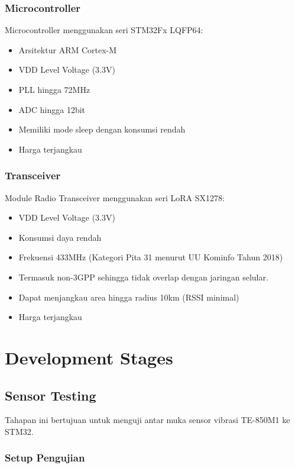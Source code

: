 \documentclass{book} %
\begin{document}
	\subsection{Microcontroller}
	
	Microcontroller menggunakan seri STM32Fx LQFP64:
	
	\begin{itemize}
		\item Arsitektur ARM Cortex-M
		\item VDD Level Voltage (3.3V)
		\item PLL hingga 72MHz
		\item ADC hingga 12bit
		\item Memiliki mode sleep dengan konsumsi rendah
		\item Harga terjangkau
	\end{itemize}
	
	\subsection{Transceiver}
	
	Module Radio Transceiver menggunakan seri LoRA SX1278:
	
	\begin{itemize}
		\item VDD Level Voltage (3.3V)
		\item Konsumsi daya rendah
		\item Frekuensi 433MHz (Kategori Pita 31 menurut UU Kominfo Tahun 2018)
		\item Termasuk non-3GPP sehingga tidak overlap dengan jaringan selular.
		\item Dapat menjangkau area hingga radius 10km (RSSI minimal)
		\item Harga terjangkau
	\end{itemize}
	
	\newpage
	\chapter{Development Stages}
	
	\section{Sensor Testing}
	
	Tahapan ini bertujuan untuk menguji antar muka sensor vibrasi TE-850M1 ke STM32.
	
	\subsection{Setup Pengujian}
	
\end{document}
